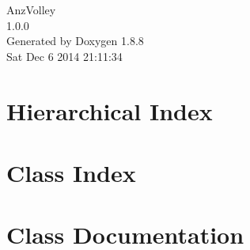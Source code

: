 \documentclass[twoside]{book}
\newcommand{\+}{\discretionary{\mbox{\scriptsize$\hookleftarrow$}}{}{}}
\newcommand{\clearemptydoublepage}{%
  \newpage{\pagestyle{empty}\cleardoublepage}%
}
\begin{document}
\hypersetup{pageanchor=false,
             bookmarks=true,
             bookmarksnumbered=true,
             pdfencoding=unicode
            }
\begin{titlepage}
\vspace*{7cm}
\begin{center}%
{\Large Anz\+Volley \\[1ex]\large 1.\+0.\+0 }\\
\vspace*{1cm}
{\large Generated by Doxygen 1.8.8}\\
\vspace*{0.5cm}
{\small Sat Dec 6 2014 21:11:34}\\
\end{center}
\end{titlepage}
\clearemptydoublepage
\tableofcontents
\clearemptydoublepage
{}
\hypersetup{pageanchor=true}

\chapter{Hierarchical Index}

\chapter{Class Index}

\chapter{Class Documentation}














\newpage
{}
{}
\printindex
\end{document}
